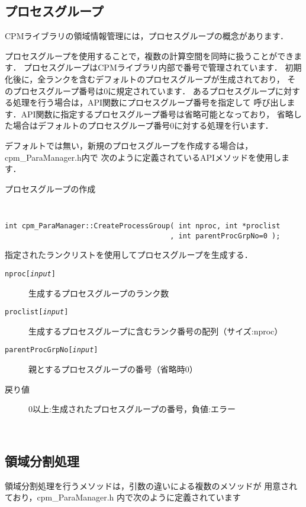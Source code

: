\clearpage


\subsection{プロセスグループ}
\label{procGrp}
CPMライブラリの領域情報管理には，プロセスグループの概念があります．

プロセスグループを使用することで，複数の計算空間を同時に扱うことができます．
プロセスグループはCPMライブラリ内部で番号で管理されています．
初期化後に，全ランクを含むデフォルトのプロセスグループが生成されており，
そのプロセスグループ番号は0に規定されています．
あるプロセスグループに対する処理を行う場合は，API関数にプロセスグループ番号を指定して
呼び出します．API関数に指定するプロセスグループ番号は省略可能となっており，
省略した場合はデフォルトのプロセスグループ番号0に対する処理を行います．

デフォルトでは無い，新規のプロセスグループを作成する場合は，cpm\_ParaManager.h内で
次のように定義されているAPIメソッドを使用します．\\

\begin{spacing}{0.8}
\begin{itembox}[l]{プロセスグループの作成}
{\tt
\begin{verbatim}
int cpm_ParaManager::CreateProcessGroup( int nproc, int *proclist
                                       , int parentProcGrpNo=0 );
\end{verbatim}
}
指定されたランクリストを使用してプロセスグループを生成する．

\begin{description}
\item[{\tt nproc[{\it input}]}] 生成するプロセスグループのランク数
\item[{\tt proclist[{\it input}]}] 生成するプロセスグループに含むランク番号の配列（サイズ:nproc）
\item[{\tt parentProcGrpNo[{\it input}]}] 親とするプロセスグループの番号（省略時0）
\\
\item[戻り値] 0以上:生成されたプロセスグループの番号，負値:エラー
\end{description}
\end{itembox}\\
\end{spacing}


\clearpage


\subsection{領域分割処理}
\label{voxelInit}
領域分割処理を行うメソッドは，引数の違いによる複数のメソッドが
用意されており，cpm\_ParaManager.h 内で次のように定義されています\\

